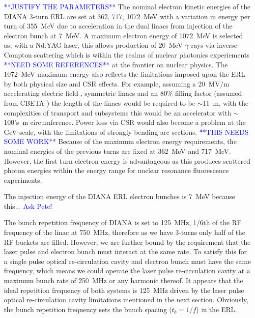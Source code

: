 \documentclass[../main.tex]{subfiles}
\begin{document}
\textcolor{blue}{**JUSTIFY THE PARAMETERS**}
The nominal electron kinetic energies of the DIANA 3-turn ERL are set at 362, 717, 1072~\si{\mega\electronvolt} with a variation in energy per turn of 355~\si{\mega\electronvolt} due to acceleration in the dual linacs from injection of the electron bunch at 7~\si{\mega\electronvolt}. A maximum electron energy of 1072~\si{\mega\electronvolt} is selected as, with a Nd:YAG laser, this allows production of 20~\si{\mega\electronvolt} $\gamma$-rays via inverse Compton scattering which is within the realms of nuclear photonics experiements\cite{} \textcolor{blue}{**NEED SOME REFERENCES**} at the frontier on nuclear physics. The 1072~\si{\mega\electronvolt} maximum energy also reflects the limitations imposed upon the ERL by both physical size and CSR effects. For example, assuming a 20~\si{\mega\volt}/\si{\meter} accelerating electric field \cite{ben2006review}, symmetric linacs and an 80\% filling factor (assumed from CBETA \cite{hoffstaetter2017cbeta}) the length of the linacs would be required to be $\sim$11~\si{\meter}, with the complexities of transport and subsystems this would be an accelerator with $\sim$100's~\si{\meter} circumference. Power loss via CSR would also become a problem at the \si{\giga\electronvolt}-scale, with the limitations of strongly bending arc sections. \textcolor{blue}{**THIS NEEDS SOME WORK**} Because of the maximum electron energy requirements, the nominal energies of the previous turns are fixed at 362~\si{\mega\electronvolt} and 717~\si{\mega\electronvolt}. However, the first turn electron energy is advantageous as this produces scattered photon energies within the energy range for nuclear resonance fluorescence experiments.          

The injection energy of the DIANA ERL electron bunches is 7~\si{\mega\electronvolt} because this...
\textcolor{blue}{Ask Pete!}

The bunch repetition frequency of DIANA is set to 125~\si{\mega\hertz}, 1/6th of the RF frequency of the linac at 750~\si{\mega\hertz}, therefore as we have 3-turns only half of the RF buckets are filled. However, we are further bound by the requirement that the laser pulse and electron bunch must interact at the same rate. To satisfy this for a single pulse optical re-circulation cavity and electron bunch must have the same frequency, which means we could operate the laser pulse re-circulation cavity at a maximum bunch rate of 250~\si{\mega\hertz} or any harmonic thereof. It appears that the ideal repetition frequency of both systems is 125~\si{\mega\hertz} driven by the laser pulse optical re-circulation cavity limitations mentioned in the next section. Obviously, the bunch repetition frequency sets the bunch spacing ($t_{b}=1/f$) in the ERL.
\end{document}
